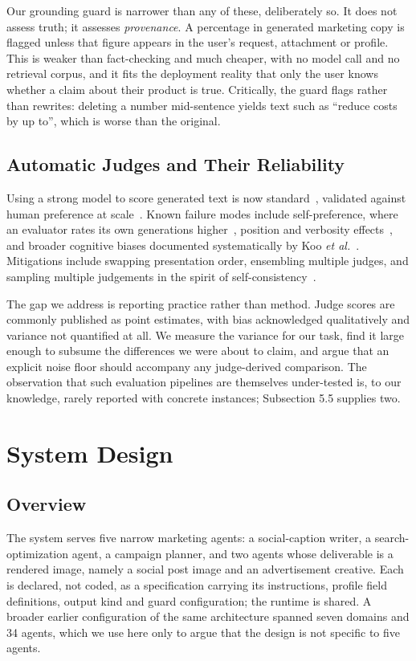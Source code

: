 \documentclass[9pt,twocolumn]{extarticle}
\begin{document}
Our grounding guard is narrower than any of these, deliberately so. It does not
assess truth; it assesses \textit{provenance}. A percentage in generated
marketing copy is flagged unless that figure appears in the user's request,
attachment or profile. This is weaker than fact-checking and much cheaper, with
no model call and no retrieval corpus, and it fits the deployment reality that
only the user knows whether a claim about their product is true. Critically,
the guard flags rather than rewrites: deleting a number mid-sentence yields
text such as ``reduce costs by up to'', which is worse than the original.

\subsection{Automatic Judges and Their Reliability}
Using a strong model to score generated text is now
standard~\cite{zheng2023judging, liu2023geval}, validated against human
preference at scale~\cite{chiang2024arena}. Known failure modes include
self-preference, where an evaluator rates its own
generations higher~\cite{panickssery2024selfpref}, position and verbosity
effects~\cite{wang2023fair}, and broader cognitive biases documented
systematically by Koo \textit{et al.}~\cite{koo2023benchmarking}. Mitigations
include swapping presentation order, ensembling multiple judges, and sampling
multiple judgements in the spirit of
self-consistency~\cite{wang2023selfconsistency}.

The gap we address is reporting practice rather than method. Judge scores are
commonly published as point estimates, with bias acknowledged qualitatively and
variance not quantified at all. We measure the variance for our task, find it
large enough to subsume the differences we were about to claim, and argue that
an explicit noise floor should accompany any judge-derived comparison. The
observation that such evaluation pipelines are themselves under-tested is, to
our knowledge, rarely reported with concrete instances; Subsection 5.5 supplies
two.

\section{System Design}

\subsection{Overview}
The system serves five narrow marketing agents: a social-caption writer, a
search-optimization agent, a campaign planner, and two agents whose deliverable
is a rendered image, namely a social post image and an advertisement creative.
Each is declared, not coded, as a specification carrying its instructions,
profile field definitions, output kind and guard configuration; the runtime is
shared. A broader earlier configuration of the same architecture spanned seven
domains and 34 agents, which we use here only to argue that the design is not
specific to five agents.
\end{document}
